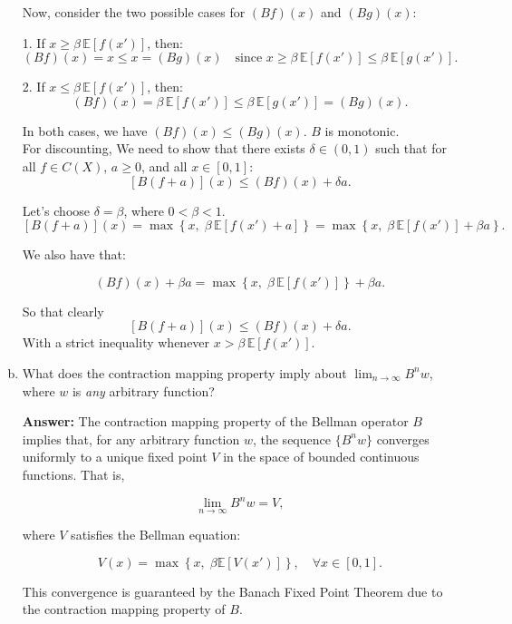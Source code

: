 \documentclass[11pt]{extarticle}
\theoremstyle{plain}
\theoremstyle{definition}
\begin{document}
\begin{enumerate}[(a)]
Now, consider the two possible cases for \( (Bf)(x) \) and \( (Bg)(x) \):

1. If \( x \geq \beta \, \mathbb{E} \left[ f(x') \right] \), then:
   \[
   (Bf)(x) = x \leq x = (Bg)(x) \quad \text{since } x \geq \beta \, \mathbb{E} \left[ f(x') \right] \leq \beta \, \mathbb{E} \left[ g(x') \right].
   \]

2. If \( x \leq \beta \, \mathbb{E} \left[ f(x') \right] \), then:
   \[
   (Bf)(x) = \beta \, \mathbb{E} \left[ f(x') \right] \leq \beta \, \mathbb{E} \left[ g(x') \right] = (Bg)(x).
   \]

In both cases, we have \( (Bf)(x) \leq (Bg)(x) \). \( B \) is monotonic.\\
For discounting, We need to show that there exists \( \delta \in (0,1) \) such that for all \( f \in C(X) \), \( a \geq 0 \), and all \( x \in [0,1] \):
\[
[B(f + a)](x) \leq (Bf)(x) + \delta a.
\]

Let’s choose \( \delta = \beta \), where \( 0 < \beta < 1 \).
\[
[B(f + a)](x) = \max \left\{ x, \; \beta \, \mathbb{E} \left[ f(x') + a \right] \right\} = \max \left\{ x, \; \beta \, \mathbb{E} \left[ f(x') \right] + \beta a \right\}.
\]

We also have that:

\[
(Bf)(x) + \beta a = \max \left\{ x, \; \beta \, \mathbb{E} \left[ f(x') \right] \right\} + \beta a.
\]

So that clearly \[
[B(f + a)](x) \leq (Bf)(x) + \delta a.
\]
With a strict inequality whenever $x > \beta \, \mathbb{E} \left[ f(x') \right] $.


\item What does the contraction mapping property imply about $\lim_{n \to \infty} B^n w$, where $w$ is \textit{any} arbitrary function? 

\textbf{Answer:} The contraction mapping property of the Bellman operator \( B \) implies that, for any arbitrary function \( w \), the sequence \( \{ B^n w \} \) converges uniformly to a unique fixed point \( V \) in the space of bounded continuous functions. That is,

\[
\lim_{n \to \infty} B^n w = V,
\]

where \( V \) satisfies the Bellman equation:

\[
V(x) = \max \left\{ x, \; \beta \mathbb{E} \left[ V(x') \right] \right\}, \quad \forall x \in [0, 1].
\]

This convergence is guaranteed by the Banach Fixed Point Theorem due to the contraction mapping property of \( B \).


\end{enumerate}
\end{document}
